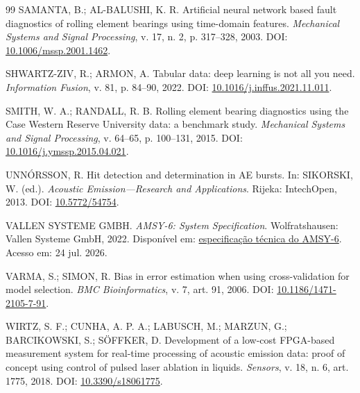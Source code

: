 \documentclass[12pt]{article}
\begin{document}
{\begin{thebibliography}{99}
	SAMANTA, B.; AL-BALUSHI, K. R.
	\newblock Artificial neural network based fault diagnostics of rolling element bearings using time-domain features.
	\newblock \emph{Mechanical Systems and Signal Processing}, v. 17, n. 2, p. 317--328, 2003.
	\newblock DOI: \href{https://doi.org/10.1006/mssp.2001.1462}{10.1006/mssp.2001.1462}.

	SHWARTZ-ZIV, R.; ARMON, A.
	\newblock Tabular data: deep learning is not all you need.
	\newblock \emph{Information Fusion}, v. 81, p. 84--90, 2022.
	\newblock DOI: \href{https://doi.org/10.1016/j.inffus.2021.11.011}{10.1016/j.inffus.2021.11.011}.

	SMITH, W. A.; RANDALL, R. B.
	\newblock Rolling element bearing diagnostics using the Case Western Reserve University data: a benchmark study.
	\newblock \emph{Mechanical Systems and Signal Processing}, v. 64--65, p. 100--131, 2015.
	\newblock DOI: \href{https://doi.org/10.1016/j.ymssp.2015.04.021}{10.1016/j.ymssp.2015.04.021}.

	UNN{\TH}{\'O}RSSON, R.
	\newblock Hit detection and determination in AE bursts.
	\newblock In: SIKORSKI, W. (ed.). \emph{Acoustic Emission---Research and Applications}.
	\newblock Rijeka: IntechOpen, 2013.
	\newblock DOI: \href{https://doi.org/10.5772/54754}{10.5772/54754}.

	VALLEN SYSTEME GMBH.
	\newblock \emph{AMSY-6: System Specification}.
	\newblock Wolfratshausen: Vallen Systeme GmbH, 2022.
	\newblock Disponível em: \href{https://www.vallen.de/zdownload/pdf/AMSY-6_Spec.pdf}{especificação técnica do AMSY-6}. Acesso em: 24 jul. 2026.

	VARMA, S.; SIMON, R.
	\newblock Bias in error estimation when using cross-validation for model selection.
	\newblock \emph{BMC Bioinformatics}, v. 7, art. 91, 2006.
	\newblock DOI: \href{https://doi.org/10.1186/1471-2105-7-91}{10.1186/1471-2105-7-91}.

	WIRTZ, S. F.; CUNHA, A. P. A.; LABUSCH, M.; MARZUN, G.; BARCIKOWSKI, S.; SÖFFKER, D.
	\newblock Development of a low-cost FPGA-based measurement system for real-time processing of acoustic emission data: proof of concept using control of pulsed laser ablation in liquids.
	\newblock \emph{Sensors}, v. 18, n. 6, art. 1775, 2018.
	\newblock DOI: \href{https://doi.org/10.3390/s18061775}{10.3390/s18061775}.


\end{thebibliography}}
\end{document}
